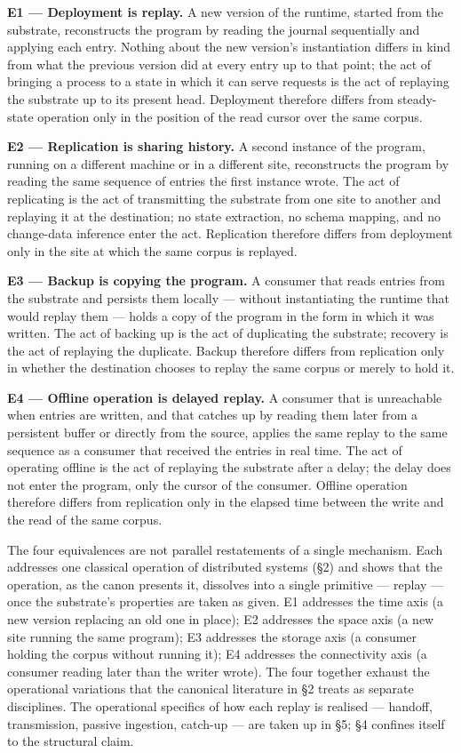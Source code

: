 \documentclass[
]{article}
\begin{document}
\textbf{E1 --- Deployment is replay.} A new version of the runtime,
started from the substrate, reconstructs the program by reading the
journal sequentially and applying each entry. Nothing about the new
version's instantiation differs in kind from what the previous version
did at every entry up to that point; the act of bringing a process to a
state in which it can serve requests is the act of replaying the
substrate up to its present head. Deployment therefore differs from
steady-state operation only in the position of the read cursor over the
same corpus.

\textbf{E2 --- Replication is sharing history.} A second instance of the
program, running on a different machine or in a different site,
reconstructs the program by reading the same sequence of entries the
first instance wrote. The act of replicating is the act of transmitting
the substrate from one site to another and replaying it at the
destination; no state extraction, no schema mapping, and no change-data
inference enter the act. Replication therefore differs from deployment
only in the site at which the same corpus is replayed.

\textbf{E3 --- Backup is copying the program.} A consumer that reads
entries from the substrate and persists them locally --- without
instantiating the runtime that would replay them --- holds a copy of the
program in the form in which it was written. The act of backing up is
the act of duplicating the substrate; recovery is the act of replaying
the duplicate. Backup therefore differs from replication only in whether
the destination chooses to replay the same corpus or merely to hold it.

\textbf{E4 --- Offline operation is delayed replay.} A consumer that is
unreachable when entries are written, and that catches up by reading
them later from a persistent buffer or directly from the source, applies
the same replay to the same sequence as a consumer that received the
entries in real time. The act of operating offline is the act of
replaying the substrate after a delay; the delay does not enter the
program, only the cursor of the consumer. Offline operation therefore
differs from replication only in the elapsed time between the write and
the read of the same corpus.

The four equivalences are not parallel restatements of a single
mechanism. Each addresses one classical operation of distributed systems
(§2) and shows that the operation, as the canon presents it, dissolves
into a single primitive --- replay --- once the substrate's properties
are taken as given. E1 addresses the time axis (a new version replacing
an old one in place); E2 addresses the space axis (a new site running
the same program); E3 addresses the storage axis (a consumer holding the
corpus without running it); E4 addresses the connectivity axis (a
consumer reading later than the writer wrote). The four together exhaust
the operational variations that the canonical literature in §2 treats as
separate disciplines. The operational specifics of how each replay is
realised --- handoff, transmission, passive ingestion, catch-up --- are
taken up in §5; §4 confines itself to the structural claim.
\end{document}
